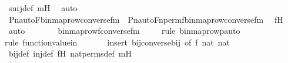 \begin{isabellebody}
\ surj{\isacharunderscore}{\kern0pt}def\ mH\ \isamarkupfalse%
\ auto\isanewline
\isanewline
\ \ \isamarkupfalse%
\ {\isachardoublequoteopen}Pn{\isacharunderscore}{\kern0pt}auto{\isacharparenleft}{\kern0pt}F{\isacharparenright}{\kern0pt}{\isacharbackquote}{\kern0pt}binmap{\isacharunderscore}{\kern0pt}row{\isacharprime}{\kern0pt}{\isacharparenleft}{\kern0pt}converse{\isacharparenleft}{\kern0pt}f{\isacharparenright}{\kern0pt}{\isacharbackquote}{\kern0pt}m{\isacharparenright}{\kern0pt}\ {\isacharequal}{\kern0pt}\ Pn{\isacharunderscore}{\kern0pt}auto{\isacharparenleft}{\kern0pt}Fn{\isacharunderscore}{\kern0pt}perm{\isacharprime}{\kern0pt}{\isacharparenleft}{\kern0pt}f{\isacharparenright}{\kern0pt}{\isacharparenright}{\kern0pt}{\isacharbackquote}{\kern0pt}binmap{\isacharunderscore}{\kern0pt}row{\isacharprime}{\kern0pt}{\isacharparenleft}{\kern0pt}converse{\isacharparenleft}{\kern0pt}f{\isacharparenright}{\kern0pt}{\isacharbackquote}{\kern0pt}m{\isacharparenright}{\kern0pt}{\isachardoublequoteclose}\ \isamarkupfalse%
\ fH\ \isamarkupfalse%
\ auto\isanewline
\ \ \isamarkupfalse%
\ \isamarkupfalse%
\ {\isachardoublequoteopen}{\isachardot}{\kern0pt}{\isachardot}{\kern0pt}{\isachardot}{\kern0pt}\ {\isacharequal}{\kern0pt}\ binmap{\isacharunderscore}{\kern0pt}row{\isacharprime}{\kern0pt}{\isacharparenleft}{\kern0pt}f{\isacharbackquote}{\kern0pt}{\isacharparenleft}{\kern0pt}converse{\isacharparenleft}{\kern0pt}f{\isacharparenright}{\kern0pt}{\isacharbackquote}{\kern0pt}m{\isacharparenright}{\kern0pt}{\isacharparenright}{\kern0pt}{\isachardoublequoteclose}\isanewline
\ \ \ \ \isamarkupfalse%
{\isacharparenleft}{\kern0pt}rule\ binmap{\isacharunderscore}{\kern0pt}row{\isacharprime}{\kern0pt}{\isacharunderscore}{\kern0pt}pauto{\isacharparenright}{\kern0pt}\isanewline
\ \ \ \ \ \isamarkupfalse%
{\isacharparenleft}{\kern0pt}rule\ function{\isacharunderscore}{\kern0pt}value{\isacharunderscore}{\kern0pt}in{\isacharparenright}{\kern0pt}\isanewline
\ \ \ \ \ \ \isamarkupfalse%
{\isacharparenleft}{\kern0pt}insert\ bij{\isacharunderscore}{\kern0pt}converse{\isacharunderscore}{\kern0pt}bij\ {\isacharbrackleft}{\kern0pt}of\ f\ nat\ nat{\isacharbrackright}{\kern0pt}{\isacharparenright}{\kern0pt}\isanewline
\ \ \ \ \isamarkupfalse%
\ bij{\isacharunderscore}{\kern0pt}def\ inj{\isacharunderscore}{\kern0pt}def\ fH\ nat{\isacharunderscore}{\kern0pt}perms{\isacharunderscore}{\kern0pt}def\ mH\isanewline
\ \ \ \ \isamarkupfalse%

\end{isabellebody}
